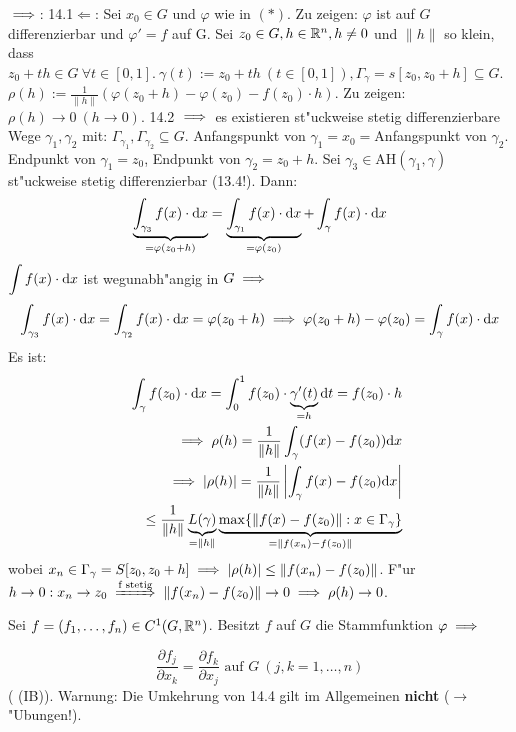 \documentclass[a4paper,twoside,DIV15,BCOR12mm]{scrbook}
\begin{document}
\begin{beweis}
\glqq$\implies$\grqq: 14.1\quad \glqq$\Leftarrow$\grqq: Sei $x_0\in G$ und $\varphi$ wie in $(*)$. Zu zeigen: $\varphi$ ist auf $G$ differenzierbar und $\varphi'=f$ auf G. Sei $z_0\in G, h\in\mathbb{R}^n,h\ne 0$ und $\|h\|$ so klein, dass $z_0+th\in G\ \forall t\in[0,1].\ \gamma(t):=z_0+th\ (t\in[0,1]), \Gamma_\gamma=s[z_0, z_0+h]\subseteq G$. $\rho(h):=\frac{1}{\|h\|}(\varphi(z_0+h)-\varphi(z_0)-f(z_0)\cdot h)$. Zu zeigen: $\rho(h)\to 0\ (h\to 0)$. 14.2 $\implies$ es existieren st"uckweise stetig differenzierbare Wege $\gamma_1, \gamma_2$ mit: $\Gamma_{\gamma_1},\Gamma_{\gamma_2}\subseteq G$. Anfangspunkt von $\gamma_1=x_0=$Anfangspunkt von $\gamma_2$. Endpunkt von $\gamma_1=z_0$, Endpunkt von $\gamma_2=z_0+h$. Sei $\gamma_3\in \text{AH}(\gamma_1,\gamma)$ st"uckweise stetig differenzierbar (13.4!). Dann: 
$$\underbrace{\displaystyle\int_{\gamma_3}f(x)\cdot\text{d}x}_{=\varphi(z_0+h)}=\underbrace{\displaystyle\int_{\gamma_1}f(x)\cdot\text{d}x}_{=\varphi(z_0)}+\displaystyle\int_{\gamma}f(x)\cdot\text{d}x$$
$\displaystyle\int f(x)\cdot\text{d}x$ ist wegunabh"angig in $G\implies$\\
$$\displaystyle\int_{\gamma_3}f(x)\cdot\text{d}x=\displaystyle\int_{\gamma_2}f(x)\cdot\text{d}x=\varphi(z_0+h)\implies\varphi(z_0+h)-\varphi(z_0)=\displaystyle\int_{\gamma}f(x)\cdot\text{d}x$$
Es ist:
\begin{eqnarray*}
&&\displaystyle\int_{\gamma}f(z_0)\cdot\text{d}x=\displaystyle\int_0^1 f(z_0)\cdot\underbrace{\gamma'(t)}_{=h}\text{d}t=f(z_0)\cdot h\\
&&\implies \rho(h)=\frac{1}{\|h\|}\displaystyle\int_{\gamma}(f(x)-f(z_0))\text{d}x\\
&&\implies |\rho(h)|=\frac{1}{\|h\|}\left|\displaystyle\int_{\gamma}f(x)-f(z_0)\text{d}x\right|\\
&&\le\frac{1}{\|h\|}\underbrace{L(\gamma)}_{=\|h\|}\underbrace{\max\{\|f(x)-f(z_0)\|: x\in\Gamma_\gamma\}}_{=\|f(x_n)-f(z_0)\|}
\end{eqnarray*}
wobei $x_n\in\Gamma_\gamma=S[z_0,z_0+h]\implies |\rho(h)|\le\|f(x_n)-f(z_0)\|$. F"ur $h\to 0: x_n\to z_0\folgtnach{f stetig}\|f(x_n)-f(z_0)\|\to 0\folgt\rho(h)\to 0$.
\end{beweis}

\begin{satz}[Integrabilitätsbedingungen]
Sei $f=(f_1,\ldots, f_n)\in C^1(G,\mathbb{R}^n)$. Besitzt $f$ auf $G$ die Stammfunktion $\varphi\implies$

$$\frac{\partial f_j}{\partial x_k}=\frac{\partial f_k}{\partial x_j}\text{ auf }G\ (j,k=1,\ldots,n)$$
( (IB)). Warnung: Die Umkehrung von 14.4 gilt im Allgemeinen \textbf{nicht} ($\to$ "Ubungen!).
\end{satz}
\end{document}
